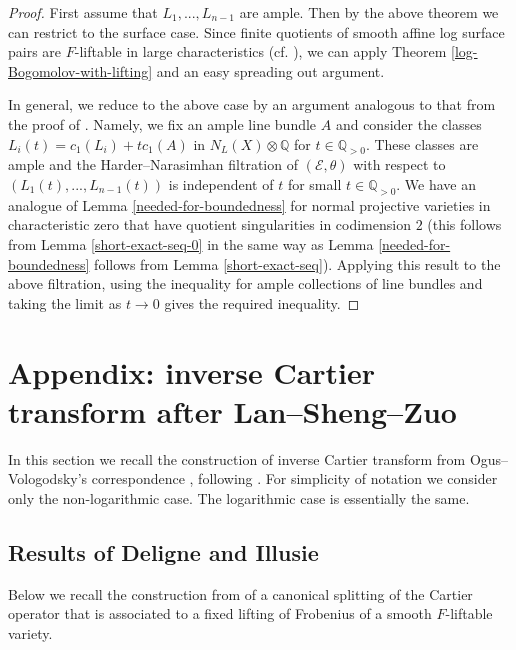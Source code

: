 \documentclass[12pt]{article}
\theoremstyle{plain}
\theoremstyle{definition}
\theoremstyle{remark}
\newcommand{\QQ}{{\mathbb Q}}
\newcommand{\cE}{{\mathcal E}}
\begin{document}
\begin{proof}	
First assume that $L_1,...,L_{n-1}$ are ample. Then by the above theorem we can restrict to the surface case.  Since finite quotients of smooth affine log surface pairs are $F$-liftable in large characteristics (cf. \cite[Lemma 4.21]{Zd}), we can apply Theorem \ref{log-Bogomolov-with-lifting} and an easy spreading out argument.
	
	
In general, we reduce to the above case by an argument analogous to that from the proof of \cite[3.6]{La1}. Namely, we fix an ample line bundle $A$ and consider the classes $L_i(t)=c_1(L_i)+tc_1(A)$ in $N_L(X)\otimes \QQ $ for $t\in \QQ_{>0}$. These classes are ample and the Harder--Narasimhan filtration of $(\cE, \theta)$ with respect to $(L_1(t),...,L_{n-1}(t))$ is independent of $t$ for small $t\in \QQ_{>0}$. 
We have an analogue of Lemma \ref{needed-for-boundedness} for  normal projective varieties in characteristic zero that have quotient singularities in codimension $2$ (this follows from Lemma \ref{short-exact-seq-0} in the same way as Lemma \ref{needed-for-boundedness} follows from Lemma \ref{short-exact-seq}).
Applying this result to the above filtration, using the inequality  for ample collections of line bundles and taking the limit as $t\to 0$ gives the required inequality.
\end{proof}



\section{Appendix: inverse Cartier transform after Lan--Sheng--Zuo}\label{Appendix}

In this section we recall the construction of  inverse Cartier transform from Ogus--Vologodsky's correspondence \cite{OV}, following \cite{LSZ2}. For simplicity of notation we consider only the  non-logarithmic case. The logarithmic case is essentially the same.


\subsection{Results of Deligne and Illusie}\label{Deligne-Illusie}

Below we recall the construction from \cite{DI} of a canonical splitting of the Cartier operator that is associated to a fixed lifting of Frobenius of a smooth $F$-liftable variety. 

\medskip
 
\end{document}
